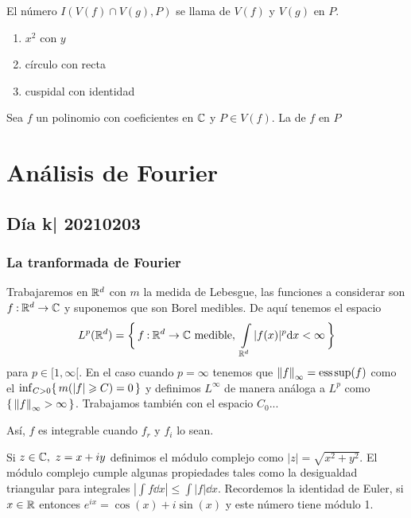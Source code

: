 \documentclass[12pt]{memoir}
\begin{document}
\begin{Def}
  El número $I(V(f)\cap V(g),P)$ se llama  de $V(f)$ y $V(g)$ en $P$.
\end{Def}

\begin{Ex}
  \begin{enumerate}
    \item $x^2$ con $y$
    \item círculo con recta
    \item cuspidal con identidad
  \end{enumerate}
\end{Ex}

\begin{Def}
  Sea $f$ un polinomio con coeficientes en $\mathbb{C}$ y $P\in V(f)$. La  de $f$ en $P$
\end{Def}

\chapter{Análisis de Fourier}

\section{Día k| 20210203}
\subsection{La tranformada de Fourier}

Trabajaremos en $\mathbb{R}^d$ con $m$ la medida de Lebesgue, las funciones a considerar son $f\mathbin{:}\mathbb{R}^d\to\mathbb{C}$ y suponemos que son Borel medibles. De aquí tenemos el espacio
$$L^p(\bR^d)=\Set{f\:\bR^d\to\bC\ \text{medible},\ \int\limits_{\bR^d}|f(x)|^p\dd x<\infty}$$
para $p\in[1,\infty[$. En el caso cuando $p=\infty$ tenemos que $\left\|f\right\|_\infty=\operatorname*{ess\hspace{0.5mm}sup}(f)$ como el $\inf_{C>0}\{\,m(|f|\geqslant C)=0\,\}$ y definimos $L^\infty$ de manera análoga a $L^p$ como $\{\,\left\|f\right\|_\infty>\infty\,\}$. Trabajamos también con el espacio $C_0$... 
\par
Así, $f$ es integrable cuando $f_r$ y $f_i$ lo sean.\par 
Si $z\in\mathbb{C},\ z=x+iy$ definimos el módulo complejo como $|z|=\sqrt{x^2+y^2}$. El módulo complejo cumple algunas propiedades tales como la desigualdad triangular para integrales $\left|\int f\dd x\right|\leq\int|f|\dd x$. Recordemos la identidad de Euler, si $x\in\mathbb{R}$ entonces $e^{ix}=\cos(x)+i\sin(x)$ y este número tiene módulo 1.
\end{document}
